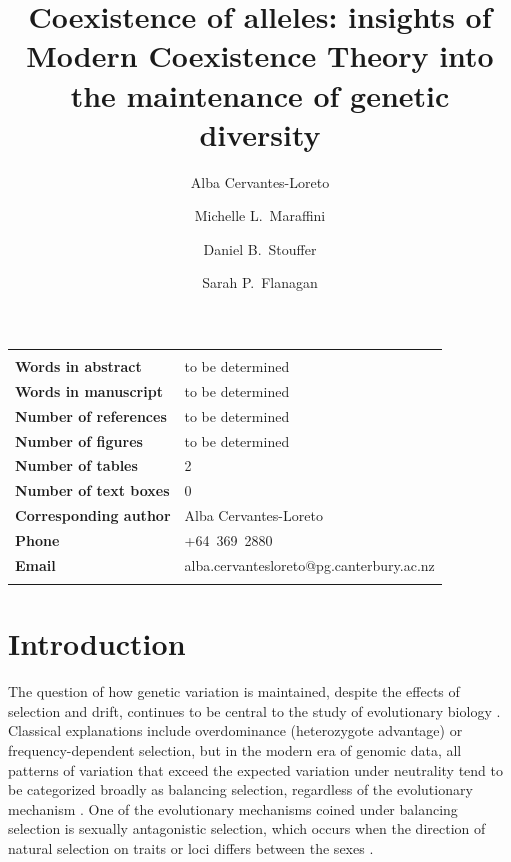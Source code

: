 \documentclass[12pt]{article}
\title{Coexistence of alleles: insights of Modern Coexistence Theory into the maintenance of genetic diversity}
\author[1]{Alba Cervantes-Loreto}
\author[1]{Michelle L.\ Maraffini}
\author[1]{Daniel B.\ Stouffer}
\author[1]{Sarah P.\ Flanagan}
\affil[1]{Centre for Integrative Ecology, School of Biological Sciences\\ University of Canterbury, Christchurch 8140, New Zealand}
\date{}
\newenvironment{ecolettcover}{\maketitle}{\clearpage}
\begin{document}
\linenumbers
\baselineskip30pt
\maketitle

\begin{ecolettcover}

\begin{center}
\begin{tabular}{ll}
\hline \\

\bf{Words in abstract}         & to be determined \\
\bf{Words in manuscript}       & to be determined\\
\bf{Number of references}      & to be determined  \\
\bf{Number of figures}			& to be determined \\
\bf{Number of tables} 			& 2 \\
\bf{Number of text boxes}		& 0 \\
\bf{Corresponding author}      & Alba Cervantes-Loreto \\
\bf{Phone}                     & +64~369~2880 \\

\bf{Email}                     & alba.cervantesloreto@pg.canterbury.ac.nz \\
                                                                        \\
\hline
\end{tabular}
\end{center}

\maketitle

\end{ecolettcover}
\section{Introduction}
The question of how genetic variation is maintained, despite the effects of selection and drift, continues to be central to the study of evolutionary biology \citep{walsh_evolution_2018}. Classical explanations include overdominance (heterozygote advantage) or frequency-dependent selection, but in the modern era of genomic data, all patterns of variation that exceed the expected variation under neutrality tend to be categorized broadly as balancing selection, regardless of the evolutionary mechanism \citep{mitchell-olds_which_2007}.  One of the evolutionary mechanisms coined under balancing selection is sexually antagonistic selection, which occurs when the direction of natural selection on traits or loci differs between the sexes \citep{connallon2018environmental}.
\end{document}
